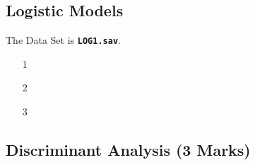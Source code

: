 \subsection{Logistic Models}
The Data Set is \textbf{\texttt{LOG1.sav}}.
\begin{itemize}
\item[1]
\item[2]
\item[3]
\end{itemize}

\subsection{Discriminant Analysis (3 Marks)}












